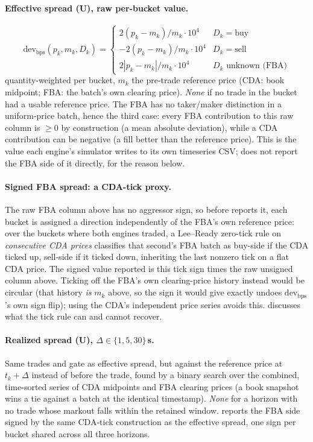\paragraph{Effective spread (U), raw per-bucket value.}
\begin{equation}
  \mathrm{dev}_{\mathrm{bps}}(p_k, m_k, D_k) =
  \begin{cases}
    2(p_k - m_k)/m_k \cdot 10^{4} & D_k = \text{buy}\\
    -2(p_k - m_k)/m_k \cdot 10^{4} & D_k = \text{sell}\\
    2|p_k - m_k|/m_k \cdot 10^{4} & D_k \text{ unknown (FBA)}
  \end{cases}
\end{equation}
quantity-weighted per bucket, $m_k$ the pre-trade reference price (CDA:
book midpoint; FBA: the batch's own clearing price). \emph{None} if no
trade in the bucket had a usable reference price. The FBA has no
taker/maker distinction in a uniform-price batch, hence the third case:
every FBA contribution to this raw column is $\ge 0$ by construction (a
mean absolute deviation), while a CDA contribution can be negative (a
fill better than the reference price). This is the value each engine's
simulator writes to its own timeseries CSV;  does not
report the FBA side of it directly, for the reason below.

\paragraph{Signed FBA spread: a CDA-tick proxy.} The raw FBA column above
has no aggressor sign, so before  reports it, each bucket
is assigned a direction independently of the FBA's own reference price:
over the buckets where both engines traded, a Lee--Ready zero-tick rule
\citep{leeready1991} on \emph{consecutive CDA prices} classifies that
second's FBA batch as buy-side if the CDA ticked up, sell-side if it
ticked down, inheriting the last nonzero tick on a flat CDA price. The
signed value reported is this tick sign times the raw unsigned column
above. Ticking off the FBA's own clearing-price history instead would be
circular (that history \emph{is} $m_k$ above, so the sign it would give
exactly undoes $\mathrm{dev}_{\mathrm{bps}}$'s own sign flip); using the
CDA's independent price series avoids this.  discusses
what the tick rule can and cannot recover.

\paragraph{Realized spread (U), $\Delta \in \{1,5,30\}$\,s.} Same trades
and gate as effective spread, but against the reference price at
$t_k+\Delta$ instead of before the trade, found by a binary search over
the combined, time-sorted series of CDA midpoints and FBA clearing
prices (a book snapshot wins a tie against a batch at the identical
timestamp). \emph{None} for a horizon with no trade whose markout falls
within the retained window.  reports the FBA side signed
by the same CDA-tick construction as the effective spread, one sign per
bucket shared across all three horizons.

